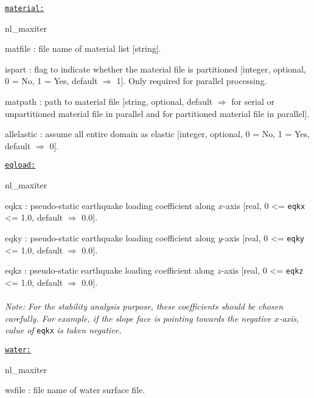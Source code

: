 \texttt{\underline{material:}}
\begin{adescription}{nl\_maxiter}
  \item[matfile]: file name of material list [string].
  \item[ispart]: flag to indicate whether the material file is partitioned [integer, optional, 0 = No, 1 = Yes, default $\Rightarrow$ 1]. Only required for parallel processing.
  \item[matpath]: path to material file [string, optional, default $\Rightarrow$ \texttt{} for serial or unpartitioned material file in parallel and \texttt{} for partitioned material file in parallel].
  \item[allelastic]: assume all entire domain as elastic [integer, optional, 0 = No, 1 = Yes, default $\Rightarrow$ 0].\\
\end{adescription}

\texttt{\underline{eqload:}}
\begin{adescription}{nl\_maxiter}
  \item[eqkx]: pseudo-static earthquake loading coefficient along $x$-axis [real, 0 <= \texttt{eqkx} <= 1.0, default $\Rightarrow$ 0.0].
  \item[eqky]: pseudo-static earthquake loading coefficient along $y$-axis [real, 0 <= \texttt{eqky} <= 1.0, default $\Rightarrow$ 0.0].
  \item[eqkz]: pseudo-static earthquake loading coefficient along $z$-axis [real, 0 <= \texttt{eqkz} <= 1.0, default $\Rightarrow$ 0.0].
  \\\\
  {\emph{Note: For the stability analysis purpose, these coefficients should be chosen carefully. For example, if the slope face is pointing towards the negative $x$-axis, value of}} \texttt{eqkx} {\emph{is taken negative.}} \\
\end{adescription}

\texttt{\underline{water:}}
\begin{adescription}{nl\_maxiter}
  \item[wsfile]: file name of water surface file.\\
\end{adescription}

